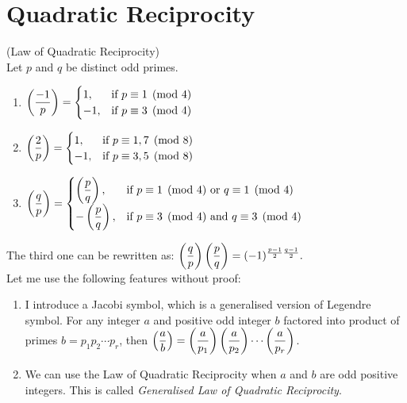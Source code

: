 \section{Quadratic Reciprocity}

\begin{theorem}
(Law of Quadratic Reciprocity) \\
Let $p$ and $q$ be distinct odd primes. 
\begin{enumerate}
  \item $
    \legendre{-1} = \begin{cases} 
      1, & \text{if } p\equiv 1\pmod{4} \\
      -1, & \text{if } p\equiv 3\pmod{4}
    \end{cases}  
  $
  \item $
    \legendre{2} = \begin{cases}
      1, & \text{if } p\equiv 1, 7\pmod{8} \\
      -1, & \text{if } p\equiv 3, 5\pmod{8}
    \end{cases}
  $
  \item $
    \legendre{q} = \begin{cases}
      \legendre[q]{p}, & \text{if } p\equiv 1\pmod{4} \text{ or } q\equiv 1\pmod{4} \\
      -\legendre[q]{p}, & \text{if } p\equiv 3\pmod{4} \text{ and } q\equiv 3\pmod{4}
    \end{cases}
  $
\end{enumerate}
\end{theorem}

\noindent
The third one can be rewritten as: $\legendre{q} \legendre[q]{p} = (-1)^{\frac{p - 1}{2} \frac{q - 1}{2}}.$ \\
Let me use the following features without proof:
\begin{enumerate}
  \item I introduce a Jacobi symbol, which is a generalised version of Legendre symbol. For any integer $a$ and positive odd integer $b$ factored into product of primes $b = p_{1}p_{2}\cdots p_{r}$, then $\legendre[b]{a} = \legendre[p_{1}]{a} \legendre[p_{2}]{a}\cdots \legendre[p_{r}]{a}$. 
  \item We can use the Law of Quadratic Reciprocity when $a$ and $b$ are odd positive integers. This is called \textit{Generalised Law of Quadratic Reciprocity}.
\end{enumerate}
